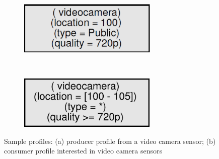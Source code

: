 \begin{figure}
    \centering
    \begin{subfigure}[t]{0.5\textwidth}
        \centering
        \includegraphics[height=1in]{Figures/data_profile.pdf}
        \caption{}
        \label{fig:data_profile}
    \end{subfigure}%
    ~ 
    \begin{subfigure}[t]{0.5\textwidth}
        \centering
        \includegraphics[height=1in]{Figures/interest_profile.pdf}
        \caption{}
        \label{fig:interest_profile}
    \end{subfigure}
    \caption{Sample profiles: (a) producer profile from a video camera sensor; (b) consumer profile interested in video camera sensors}
\end{figure}



